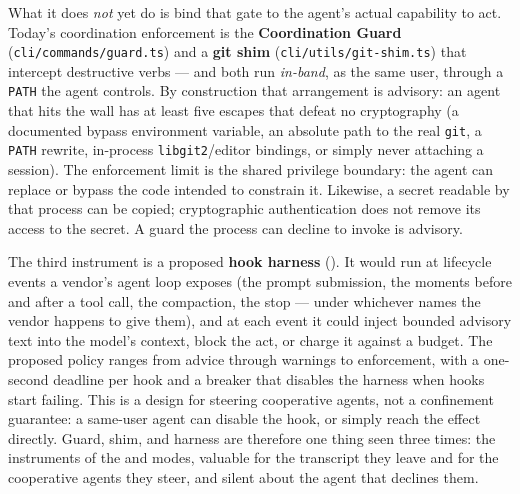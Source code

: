 \documentclass[11pt,a4paper]{article}
\theoremstyle{definition}
\theoremstyle{remark}
\begin{document}
What it does \emph{not} yet do is bind that gate to the agent's actual capability
to act. Today's coordination enforcement is the \textbf{Coordination Guard}
(\texttt{cli/commands/guard.ts}) and a \textbf{git shim}
(\texttt{cli/utils/git-shim.ts}) that intercept destructive verbs --- and both run
\emph{in-band}, as the same user, through a \texttt{PATH} the agent controls. By
construction that arrangement is advisory: an agent that hits the wall has at least
five escapes that defeat no cryptography (a documented bypass environment variable,
an absolute path to the real \texttt{git}, a \texttt{PATH} rewrite, in-process
\texttt{libgit2}/editor bindings, or simply never attaching a session). The
enforcement limit is the shared privilege boundary: the agent can replace or
bypass the code intended to constrain it. Likewise, a secret readable by that
process can be copied; cryptographic authentication does not remove its access
to the secret. A guard the process can decline to invoke is advisory.

The third instrument is a proposed \textbf{hook harness} (\Designed{}). It would
run at lifecycle events a vendor's agent loop exposes (the prompt
submission, the moments before and after a tool call, the compaction, the
stop --- under whichever names the vendor happens to give them), and at each
event it could inject bounded advisory text into the model's context, block
the act, or charge it against a budget. The proposed policy ranges from advice
through warnings to enforcement, with a one-second deadline per hook and a
breaker that disables the harness when hooks start failing. This is a design
for steering cooperative agents, not a confinement guarantee: a same-user agent can disable
the hook, or simply reach the effect directly. Guard, shim, and harness are
therefore one thing seen three times: the instruments of the
 and  modes, valuable for the
transcript they leave and for the cooperative agents they steer, and silent
about the agent that declines them.
\end{document}
